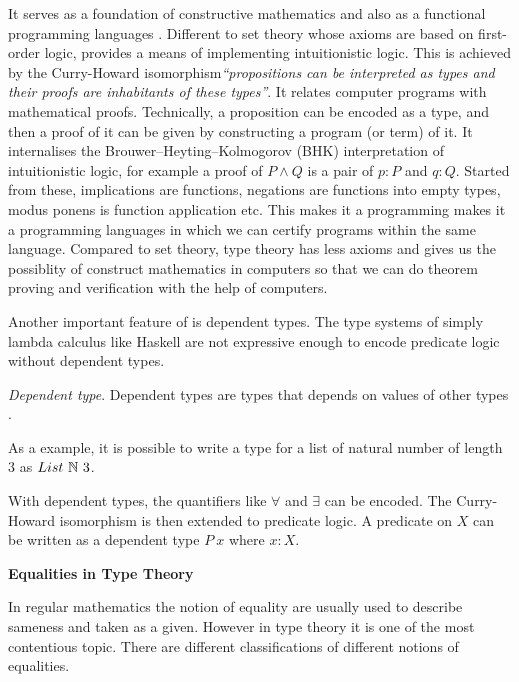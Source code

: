 It serves as a foundation of constructive mathematics \cite{martin1984intuitionistic} and also as a functional programming languages \cite{DBLP:dblp_journals/tcs/Troelstra99}. Different to set theory whose axioms are based on first-order logic, \mltt provides a means of implementing intuitionistic logic. This is achieved by the Curry-Howard
isomorphism\emph{``propositions can be interpreted as types and their
  proofs are inhabitants of these types''}. It relates computer programs with mathematical proofs. Technically, a proposition can be encoded as a type, and then a proof of it can be given by constructing a program (or term) of it. It internalises the  Brouwer–Heyting–Kolmogorov (BHK) interpretation of intuitionistic logic, for example a proof of $P \wedge Q$ is a pair of $p : P$ and $q : Q$.
Started from these, implications are functions, negations are functions into empty types, modus ponens is function application etc. This makes it a programming makes it a programming languages in which we can certify programs within the same language.
Compared to set theory, type theory has less axioms and gives us the possiblity of construct mathematics in computers so that we can do theorem proving and verification with the help of computers.

Another important feature of \mltt is dependent types. The type systems of simply lambda calculus like Haskell are not expressive enough to encode predicate logic without dependent types.

\begin{definition}\label{dpty}
\textit{Dependent type}. Dependent types are types that depends on values of other types \cite{dtw}. 
\end{definition}

As a example, it is possible to write a type for a list of natural number of length 3 as $List~\mathbb{N} ~3$. 

With dependent types, the quantifiers like $\forall$ and $\exists$ can be encoded.
The Curry-Howard isomorphism is then extended to predicate logic. 
A predicate on $X$ can be written as a dependent type $P ~x$ where $x : X$. 


\textbf{Equalities in Type Theory}


In regular mathematics the notion of equality are usually used to describe sameness and taken as a given.
However in type theory it is one of the most contentious topic.
There are different classifications of different notions of equalities.

